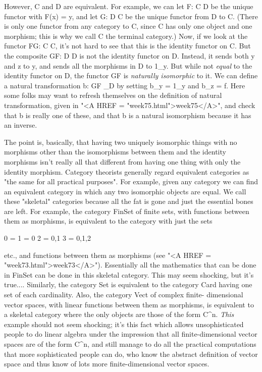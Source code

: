 However, C and D are equivalent.  For example, we can let F: C \to  D
be the unique functor with F(x) = y, and let G: D \to  C be the unique
functor from D to C.  (There is only one functor from any category to C,
since C has only one object and one morphism; this is why we call C the
terminal category.)  Now, if we look at the functor FG: C \to  C, it's
not hard to see that this is the identity functor on C.  But the
composite GF: D \to  D is not the identity functor on D.  Instead, it
sends both y and z to y, and sends all the morphisms in D to
1_{y}.  But while not \emph{equal} to the identity functor on
D, the functor GF is \emph{naturally isomorphic} to it.  We can define
a natural transformation b: GF _{D} by setting
b_{y} = 1_{y} and b_{z} = f.  Here some folks
may want to refresh themselves on the definition of natural
transformation, given in "<A HREF = "week75.html">week75</A>",
and check that b is really one of these, and that b is a natural
isomorphism because it has an inverse.

The point is, basically, that having two uniquely isomorphic things with
no morphisms other than the isomorphisms between them and the identity
morphisms isn't really all that different from having one thing with
only the identity morphism.  Category theorists generally regard
equivalent categories as "the same for all practical purposes".  For
example, given any category we can find an equivalent category in which
any two isomorphic objects are equal.  We call these "skeletal"
categories because all the fat is gone and just the essential bones are
left.  For example, the category FinSet of finite sets, with functions
between them as morphisms, is equivalent to the category with just the
sets

0 = {}
1 = {0}
2 = {0,1}
3 = {0,1,2}


etc., and functions between them as morphisms (see "<A HREF =
"week73.html">week73</A>").  Essentially all the mathematics that
can be done in FinSet can be done in this skeletal category.  This may
seem shocking, but it's true....  Similarly, the category Set is
equivalent to the category Card having one set of each cardinality.
Also, the category Vect of complex finite- dimensional vector spaces,
with linear functions between them as morphisms, is equivalent to a
skeletal category where the only objects are those of the form
C^{n}.  \emph{This} example should not seem shocking; it's
this fact which allows unsophisticated people to do linear algebra under
the impression that all finite-dimensional vector spaces are of the form
C^{n}, and still manage to do all the practical computations
that more sophisticated people can do, who know the abstract definition
of vector space and thus know of lots more finite-dimensional vector
spaces.

